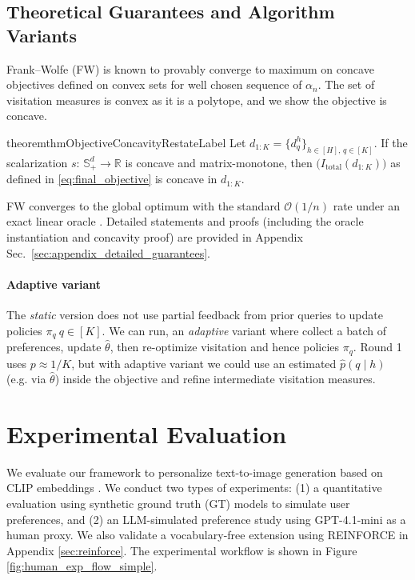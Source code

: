 \documentclass{article}
\begin{document}
\vspace{-0.2cm}\subsection{Theoretical Guarantees and Algorithm Variants }
\label{sec:guarantees_highlights}
 Frank--Wolfe (FW) is known to provably converge to maximum on concave objectives defined on convex sets for well chosen sequence of $\alpha_n$. The set of visitation measures is convex as it is a polytope, and we show the objective is concave. 
\begin{restatable}{theorem}{thmObjectiveConcavityRestateLabel}
\label{thm:objective_concavity}
Let $d_{1:K} = \{d^h_q\}_{h \in [H],\, q \in [K]}$. If the scalarization $s:\,\mathbb{S}^d_+\!\to\!\mathbb{R}$ is concave and matrix-monotone, then $\big(I_{\text{total}}(d_{1:K})\big)$ as defined in \eqref{eq:final_objective} is concave in $d_{1:K}$.
\end{restatable}
\vspace{-0.2cm} FW converges to the global optimum with the standard $\mathcal{O}(1/n)$ rate under an exact linear oracle \citep{pmlr-v28-jaggi13}. Detailed statements and proofs (including the oracle instantiation and concavity proof) are provided in Appendix Sec.~\ref{sec:appendix_detailed_guarantees}. %

 \vspace{-0.2cm} \paragraph{Adaptive variant} The \emph{static} version does not use partial feedback from prior queries to update policies $\pi_q ~ q \in [K]$. We can run, an \emph{adaptive} variant where collect a batch of preferences, update $\hat{\theta}$, then re-optimize visitation and hence policies $\pi_q$. Round 1 uses $p\approx 1/K$, but with adaptive variant we could use an estimated $\hat{p}(q\mid h)$ (e.g. via $\hat{\theta}$) inside the objective and refine intermediate visitation measures.


\vspace{-0.2cm} \section{Experimental Evaluation}
\label{sec:experiments_main}\vspace{-0.2cm}
We evaluate our framework to personalize text-to-image generation based on CLIP embeddings \cite{radford2021learning}. We conduct two types of experiments: (1) a quantitative evaluation using synthetic ground truth (GT) models to simulate user preferences, and (2) an LLM-simulated preference study using GPT-4.1-mini as a human proxy. We also validate a vocabulary-free extension using REINFORCE in Appendix \ref{sec:reinforce}. The experimental workflow is shown in Figure \ref{fig:human_exp_flow_simple}.
\end{document}
